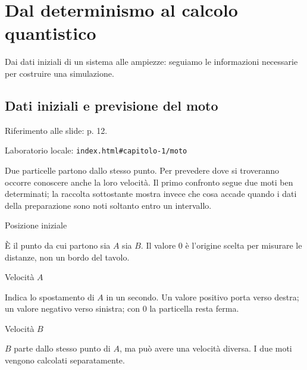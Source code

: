 \setcounter{chapter}{0}
\chapter{Dal determinismo al calcolo quantistico}
\label{chapter-1}

Dai dati iniziali di un sistema alle ampiezze: seguiamo le informazioni necessarie per costruire una simulazione.\par



\Needspace{.43\textheight}
\section{Dati iniziali e previsione del moto}
\label{c1-moto}

{\sffamily\small\color{Ink!70} Riferimento alle slide: p. 12.\par}

{\sffamily\small\color{Ink!70} Laboratorio locale: \nolinkurl{index.html#capitolo-1/moto}\par}

Due particelle partono dallo stesso punto. Per prevedere dove si troveranno occorre conoscere anche la loro velocità. Il primo confronto segue due moti ben determinati; la raccolta sottostante mostra invece che cosa accade quando i dati della preparazione sono noti soltanto entro un intervallo.\par



Posizione iniziale\par

È il punto da cui partono sia \(A\) sia \(B\). Il valore 0 è l'origine scelta per misurare le distanze, non un bordo del tavolo.\par

Velocità \(A\)\par

Indica lo spostamento di \(A\) in un secondo. Un valore positivo porta verso destra; un valore negativo verso sinistra; con 0 la particella resta ferma.\par

Velocità \(B\)\par

\(B\) parte dallo stesso punto di \(A\), ma può avere una velocità diversa. I due moti vengono calcolati separatamente.\par

